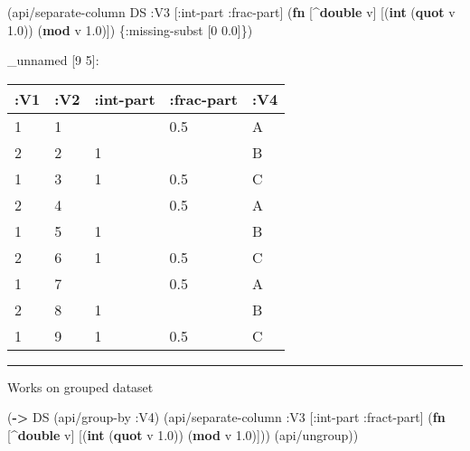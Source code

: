 \documentclass[]{article}
\newenvironment{Shaded}{\begin{snugshade}}{\end{snugshade}}
\newcommand{\AttributeTok}[1]{\textcolor[rgb]{0.77,0.63,0.00}{#1}}
\newcommand{\DecValTok}[1]{\textcolor[rgb]{0.00,0.00,0.81}{#1}}
\newcommand{\FloatTok}[1]{\textcolor[rgb]{0.00,0.00,0.81}{#1}}
\newcommand{\KeywordTok}[1]{\textcolor[rgb]{0.13,0.29,0.53}{\textbf{#1}}}
\newcommand{\NormalTok}[1]{#1}
\begin{document}
\begin{Shaded}
\begin{Highlighting}[]
\NormalTok{(api/separate-column DS }\AttributeTok{:V3}\NormalTok{ [}\AttributeTok{:int-part} \AttributeTok{:frac-part}\NormalTok{] (}\KeywordTok{fn}\NormalTok{ [^}\KeywordTok{double}\NormalTok{ v]}
\NormalTok{                                                     [(}\KeywordTok{int}\NormalTok{ (}\KeywordTok{quot}\NormalTok{ v }\FloatTok{1.0}\NormalTok{))}
\NormalTok{                                                      (}\KeywordTok{mod}\NormalTok{ v }\FloatTok{1.0}\NormalTok{)]) \{}\AttributeTok{:missing-subst}\NormalTok{ [}\DecValTok{0} \FloatTok{0.0}\NormalTok{]\})}
\end{Highlighting}
\end{Shaded}

\_unnamed {[}9 5{]}:

\begin{longtable}[]{@{}lllll@{}}
\toprule
:V1 & :V2 & :int-part & :frac-part & :V4\tabularnewline
\midrule
\endhead
1 & 1 & & 0.5 & A\tabularnewline
2 & 2 & 1 & & B\tabularnewline
1 & 3 & 1 & 0.5 & C\tabularnewline
2 & 4 & & 0.5 & A\tabularnewline
1 & 5 & 1 & & B\tabularnewline
2 & 6 & 1 & 0.5 & C\tabularnewline
1 & 7 & & 0.5 & A\tabularnewline
2 & 8 & 1 & & B\tabularnewline
1 & 9 & 1 & 0.5 & C\tabularnewline
\bottomrule
\end{longtable}

\begin{center}\rule{0.5\linewidth}{0.5pt}\end{center}

Works on grouped dataset

\begin{Shaded}
\begin{Highlighting}[]
\NormalTok{(}\KeywordTok{->}\NormalTok{ DS}
\NormalTok{    (api/group-by }\AttributeTok{:V4}\NormalTok{)}
\NormalTok{    (api/separate-column }\AttributeTok{:V3}\NormalTok{ [}\AttributeTok{:int-part} \AttributeTok{:fract-part}\NormalTok{] (}\KeywordTok{fn}\NormalTok{ [^}\KeywordTok{double}\NormalTok{ v]}
\NormalTok{                                                       [(}\KeywordTok{int}\NormalTok{ (}\KeywordTok{quot}\NormalTok{ v }\FloatTok{1.0}\NormalTok{))}
\NormalTok{                                                        (}\KeywordTok{mod}\NormalTok{ v }\FloatTok{1.0}\NormalTok{)]))}
\NormalTok{    (api/ungroup))}
\end{Highlighting}
\end{Shaded}
\end{document}
